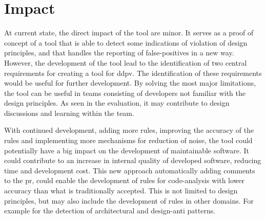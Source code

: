 \documentclass[pdftex,10pt,b5paper,twoside]{report}
\begin{document}



\section{Impact}

At current state, the direct impact of the tool are minor. It serves as a proof of concept of a tool that is able to detect some indications of violation of design principles, and that handles the reporting of false-positives in a new way. However, the development of the tool lead to the identification of two central requirements for creating a tool for \gls{ddpv}. The identification of these requirements would be useful for further development. By solving the most major limitations, the tool can be useful in teams consisting of developers not familiar with the design principles. As seen in the evaluation, it may contribute to design discussions and learning within the team.

With continued development, adding more rules, improving the accuracy of the rules and implementing more mechanisms for reduction of noise, the tool could potentially have a big impact on the development of maintainable software. It could contribute to an increase in internal quality of developed software, reducing time and development cost. This new approach automatically adding comments to the \gls{pr}, could enable the development of rules for code-analysis with lower accuracy than what is traditionally accepted. This is not limited to design principles, but may also include the development of rules in other domains. For example for the detection of architectural and design-anti patterns.
\end{document}
